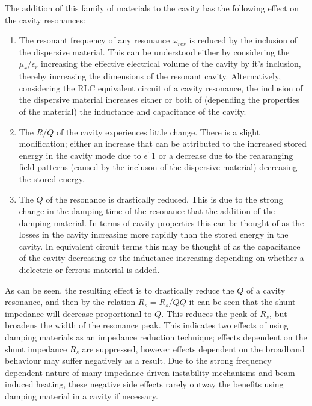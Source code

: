 The addition of this family of materials to the cavity has the following effect on the cavity resonances:

\begin{enumerate}
\item{The resonant frequency of any resonance $\omega_{res}$ is reduced by the inclusion of the dispersive material. This can be understood either by considering the $\mu_{r} / \epsilon_{r}$ increasing the effective electrical volume of the cavity by it's inclusion, thereby increasing the dimensions of the resonant cavity. Alternatively, considering the RLC equivalent circuit of a cavity resonance, the inclusion of the dispersive material increases either or both of (depending the properties of the material) the inductance and capacitance of the cavity.}
\item{The $R/Q$ of the cavity experiences little change. There is a slight modification; either an increase that can be attributed to the increased stored energy in the cavity mode due to $\epsilon^{'} \> 1$ or a decrease due to the reaaranging field patterns (caused by the incluson of the dispersive material) decreasing the stored energy.}
\item{The $Q$ of the resonance is drastically reduced. This is due to the strong change in the damping time of the resonance that the addition of the damping material. In terms of cavity properties this can be thought of as the losses in the cavity increasing more rapidly than the stored energy in the cavity. In equivalent circuit terms this may be thought of as the capacitance of the cavity decreasing or the inductance increasing depending on whether a dielectric or ferrous material is added.}
\end{enumerate} 

As can be seen, the resulting effect is to drastically reduce the $Q$ of a cavity resonance, and then by the relation $R_{s} = R_{s}/Q Q$ it can be seen that the shunt impedance will decrease proportional to $Q$. This reduces the peak of $R_{s}$, but broadens the width of the resonance peak. This indicates two effects of using damping materials as an impedance reduction technique; effects dependent on the shunt impedance $R_{s}$ are suppressed, however effects dependent on the broadband behaviour may suffer negatively as a result. Due to the strong frequency dependent nature of many impedance-driven instability mechanisms and beam-induced heating, these negative side effects rarely outway the benefits using damping material in a cavity if necessary.

